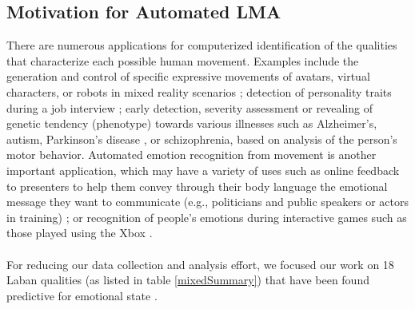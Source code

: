 \documentclass[11pt,twocolumn,varwidth=true,a4paper,fleqn]{article}
\begin{document}
\subsection{Motivation for Automated LMA}
There are numerous applications for computerized identification of the qualities that characterize each possible human movement. Examples include the generation and control of specific expressive movements 
of avatars, virtual characters, or robots in mixed reality scenarios
\cite{Masuda}; detection of personality traits during a job interview
\cite{levy2003use}; early detection, severity assessment or revealing of genetic tendency (phenotype) towards various illnesses such as Alzheimer's,
autism, Parkinson's disease \cite{camurri2003application}, or schizophrenia,
based on analysis of the person's motor behavior. Automated emotion recognition from movement is another 
important application, which may have a variety of uses such as online feedback 
to presenters to help them convey through their body language the emotional message they want to communicate 
(e.g., politicians and public speakers or actors in training) \cite{nguyen2012online}; or recognition 
of people's emotions during interactive games such as those played using the Xbox \cite{Zacharatos}. 
\\\\For reducing our data collection and analysis effort, we focused our work on 18 Laban qualities (as listed in table \ref{mixedSummary}) that have been found predictive for emotional state \cite{ShafirPrivate}.
\end{document}
